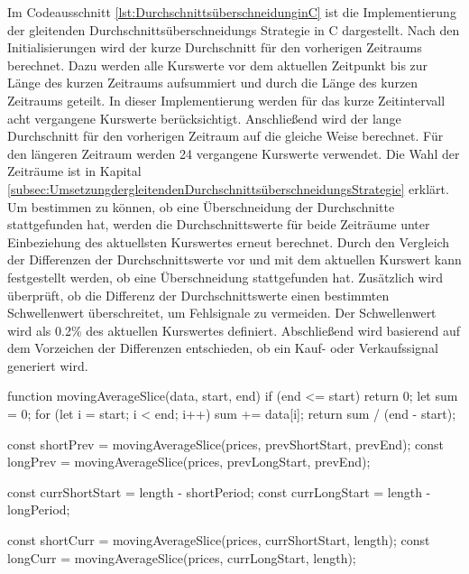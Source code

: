 Im Codeausschnitt \ref{lst:DurchschnittsüberschneidunginC} ist die Implementierung der gleitenden Durchschnittsüberschneidungs Strategie in C dargestellt.
Nach den Initialisierungen wird der kurze Durchschnitt für den vorherigen Zeitraums berechnet.
Dazu werden alle Kurswerte vor dem aktuellen Zeitpunkt bis zur Länge des kurzen Zeitraums aufsummiert und durch die Länge des kurzen Zeitraums geteilt.
In dieser Implementierung werden für das kurze Zeitintervall acht vergangene Kurswerte berücksichtigt.
Anschließend wird der lange Durchschnitt für den vorherigen Zeitraum auf die gleiche Weise berechnet.
Für den längeren Zeitraum werden 24 vergangene Kurswerte verwendet.
Die Wahl der Zeiträume ist in Kapital \ref{subsec:UmsetzungdergleitendenDurchschnittsüberschneidungsStrategie} erklärt.
\newline
Um bestimmen zu können, ob eine Überschneidung der Durchschnitte stattgefunden hat, werden die Durchschnittswerte für beide Zeiträume unter Einbeziehung des aktuellsten Kurswertes erneut berechnet.
Durch den Vergleich der Differenzen der Durchschnittswerte vor und mit dem aktuellen Kurswert kann festgestellt werden, ob eine Überschneidung stattgefunden hat.
Zusätzlich wird überprüft, ob die Differenz der Durchschnittswerte einen bestimmten Schwellenwert überschreitet, um Fehlsignale zu vermeiden.
Der Schwellenwert wird als 0.2\% des aktuellen Kurswertes definiert.
Abschließend wird basierend auf dem Vorzeichen der Differenzen entschieden, ob ein Kauf- oder Verkaufssignal generiert wird.

\begin{JsCode}[caption={Durchschnittsüberschneidung in JavaScript}, label={lst:DurchschnittsüberschneidunginJavaScript}]
    function movingAverageSlice(data, start, end) {
        if (end <= start) {
            return 0;
        }
        let sum = 0;
        for (let i = start; i < end; i++) {
            sum += data[i];
        }
        return sum / (end - start);
    }

    const shortPrev = movingAverageSlice(prices, prevShortStart, prevEnd);
    const longPrev = movingAverageSlice(prices, prevLongStart, prevEnd);

    const currShortStart = length - shortPeriod;
    const currLongStart = length - longPeriod;

    const shortCurr = movingAverageSlice(prices, currShortStart, length);
    const longCurr = movingAverageSlice(prices, currLongStart, length);
\end{JsCode}

